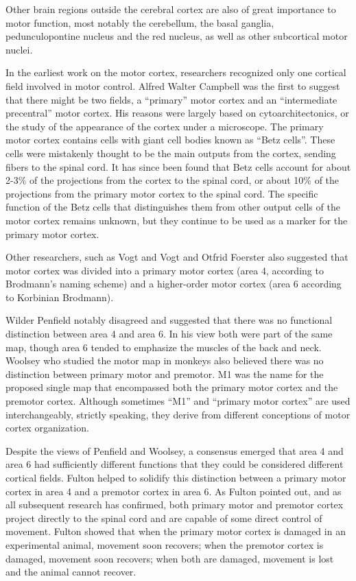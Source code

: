 Other brain regions outside the cerebral cortex are also of great importance to motor function, most notably the cerebellum, the basal ganglia, pedunculopontine nucleus and the red nucleus, as well as other subcortical motor nuclei.

In the earliest work on the motor cortex, researchers recognized only one cortical field involved in motor control. Alfred Walter Campbell was the first to suggest that there might be two fields, a ``primary'' motor cortex and an ``intermediate precentral'' motor cortex. His reasons were largely based on cytoarchitectonics, or the study of the appearance of the cortex under a microscope. The primary motor cortex contains cells with giant cell bodies known as ``Betz cells''. These cells were mistakenly thought to be the main outputs from the cortex, sending fibers to the spinal cord. It has since been found that Betz cells account for about 2-3\% of the projections from the cortex to the spinal cord, or about 10\% of the projections from the primary motor cortex to the spinal cord. The specific function of the Betz cells that distinguishes them from other output cells of the motor cortex remains unknown, but they continue to be used as a marker for the primary motor cortex.

Other researchers, such as Vogt and Vogt and Otfrid Foerster also suggested that motor cortex was divided into a primary motor cortex (area 4, according to Brodmann's naming scheme) and a higher-order motor cortex (area 6 according to Korbinian Brodmann).

Wilder Penfield notably disagreed and suggested that there was no functional distinction between area 4 and area 6. In his view both were part of the same map, though area 6 tended to emphasize the muscles of the back and neck. Woolsey who studied the motor map in monkeys also believed there was no distinction between primary motor and premotor. M1 was the name for the proposed single map that encompassed both the primary motor cortex and the premotor cortex. Although sometimes ``M1'' and ``primary motor cortex'' are used interchangeably, strictly speaking, they derive from different conceptions of motor cortex organization.

Despite the views of Penfield and Woolsey, a consensus emerged that area 4 and area 6 had sufficiently different functions that they could be considered different cortical fields. Fulton helped to solidify this distinction between a primary motor cortex in area 4 and a premotor cortex in area 6. As Fulton pointed out, and as all subsequent research has confirmed, both primary motor and premotor cortex project directly to the spinal cord and are capable of some direct control of movement. Fulton showed that when the primary motor cortex is damaged in an experimental animal, movement soon recovers; when the premotor cortex is damaged, movement soon recovers; when both are damaged, movement is lost and the animal cannot recover.

